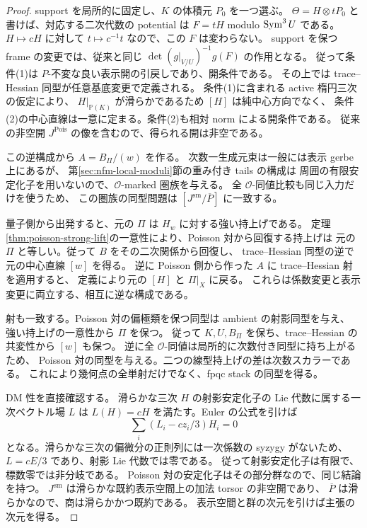 \begin{proof}
support を局所的に固定し、$K$ の体積元 $P_0$ を一つ選ぶ。
$\Theta=H\otimes tP_0$ と書けば、対応する二次代数の potential は
$F=tH$ modulo $\operatorname{Sym}^3U$ である。
$H\mapsto cH$ に対して $t\mapsto c^{-1}t$ なので、この $F$ は変わらない。
support を保つ frame の変更では、従来と同じ
$\det(g|_{V/U})^{-1}g(F)$ の作用となる。
従って条件(1)は $P$-不変な良い表示開の引戻しであり、開条件である。
その上では trace--Hessian 同型が任意基底変更で定義される。
条件(1)に含まれる active 楕円三次の仮定により、
$H|_{\mathbb P(K)}$ が滑らかであるため $[H]$ は純中心方向でなく、
条件(2)の中心直線は一意に定まる。条件(2)も相対 norm による開条件である。
従来の非空開 $J^{\mathrm{Pois}}$ の像を含むので、得られる開は非空である。

この逆構成から $A=B_\Pi/(w)$ を作る。
次数一生成元束は一般には表示 gerbe 上にあるが、
第\ref{sec:nfm-local-moduli}節の重み付き tails の構成は
周囲の有限安定化子を用いないので、$\mathcal O$-marked 圏族を与える。
全 $\mathcal O$-同値比較も同じ入力だけを使うため、
この圏族の同型問題は $[J^{\mathrm{sm}}/\overline P]$ に一致する。

量子側から出発すると、元の $\Pi$ は $H_w$ に対する強い持上げである。
定理\ref{thm:poisson-strong-lift}の一意性により、Poisson 対から回復する持上げは
元の $\Pi$ と等しい。従って $B$ をその二次関係から回復し、
trace--Hessian 同型の逆で元の中心直線 $[w]$ を得る。
逆に Poisson 側から作った $A$ に trace--Hessian 射を適用すると、
定義により元の $[H]$ と $\Pi|_X$ に戻る。
これらは係数変更と表示変更に両立する、相互に逆な構成である。

射も一致する。Poisson 対の偏極類を保つ同型は ambient の射影同型を与え、
強い持上げの一意性から $\Pi$ を保つ。
従って $K,U,B_\Pi$ を保ち、trace--Hessian の共変性から $[w]$ も保つ。
逆に全 $\mathcal O$-同値は局所的に次数付き同型に持ち上がるため、
Poisson 対の同型を与える。二つの線型持上げの差は次数スカラーである。
これにより幾何点の全単射だけでなく、fpqc stack の同型を得る。

DM 性を直接確認する。
滑らかな三次 $H$ の射影安定化子の Lie 代数に属する一次ベクトル場 $L$ は
$L(H)=cH$ を満たす。Euler の公式を引けば
\[
 \sum_i(L_i-cz_i/3)H_i=0
\]
となる。滑らかな三次の偏微分の正則列には一次係数の syzygy がないため、
$L=cE/3$ であり、射影 Lie 代数では零である。
従って射影安定化子は有限で、標数零では非分岐である。
Poisson 対の安定化子はその部分群なので、同じ結論を持つ。
$J^{\mathrm{sm}}$ は滑らかな既約表示空間上の加法 torsor の非空開であり、
$\overline P$ は滑らかなので、商は滑らかかつ既約である。
表示空間と群の次元を引けば主張の次元を得る。
\end{proof}


